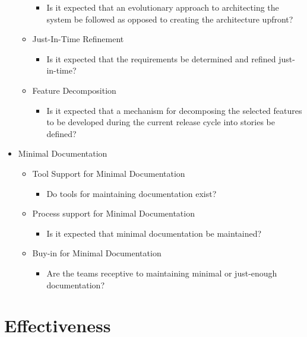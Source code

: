 \begin{appendices}
\begin{itemize}
\begin{itemize}
\begin{itemize}
					\item Is it expected that an evolutionary approach to architecting the system be followed as opposed to creating the architecture upfront?
				\end{itemize}
			\item Just-In-Time Refinement
				\begin{itemize}
					\item Is it expected that the requirements be determined and refined just-in-time?
				\end{itemize}
			\item Feature Decomposition
				\begin{itemize}
					\item Is it expected that a mechanism for decomposing the selected features to be developed during the current release cycle into stories be defined?
				\end{itemize}
		\end{itemize}
	\item Minimal Documentation
		\begin{itemize}
			\item Tool Support for Minimal Documentation
				\begin{itemize}
					\item Do tools for maintaining documentation exist?
				\end{itemize}
			\item Process support for Minimal Documentation
				\begin{itemize}
					\item Is it expected that minimal documentation be maintained?
				\end{itemize}
			\item Buy-in for Minimal Documentation
				\begin{itemize}
					\item Are the teams receptive to maintaining minimal or just-enough documentation?
				\end{itemize}
		\end{itemize}
\end{itemize}





\section{Effectiveness}


\end{appendices}
